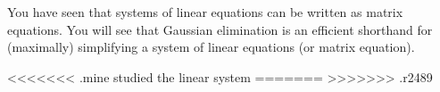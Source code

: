 \section{\gaussElimTitle}

\label{gaussElim}

You have seen that systems of linear equations can be written as matrix equations.
You will see that Gaussian elimination is an efficient shorthand for (maximally) simplifying a system of linear equations (or matrix equation).

<<<<<<< .mine
studied the linear system 
=======
>>>>>>> .r2489



